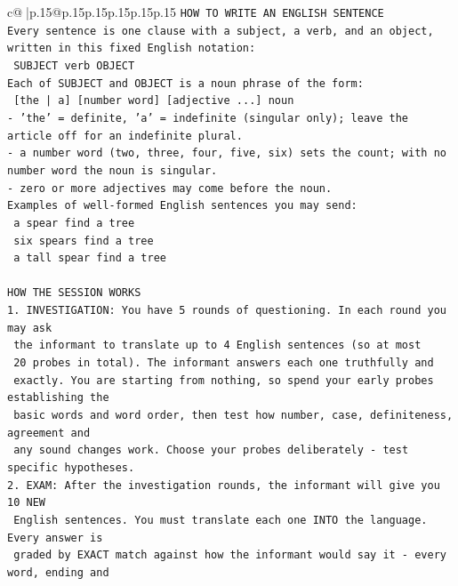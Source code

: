 \documentclass{article}
\begin{document}
{\begin{supertabular}{c@{$\;$}|p{.15\linewidth}@{}p{.15\linewidth}p{.15\linewidth}p{.15\linewidth}p{.15\linewidth}p{.15\linewidth}}
{{{\texttt{HOW TO WRITE AN ENGLISH SENTENCE} \\
\texttt{Every sentence is one clause with a subject, a verb, and an object, written in this fixed English notation:} \\
\texttt{    SUBJECT  verb  OBJECT} \\
\texttt{Each of SUBJECT and OBJECT is a noun phrase of the form:} \\
\texttt{    {[}the | a{]}  {[}number word{]}  {[}adjective ...{]}  noun} \\
\texttt{{-} 'the' = definite, 'a' = indefinite (singular only); leave the article off for an indefinite plural.} \\
\texttt{{-} a number word (two, three, four, five, six) sets the count; with no number word the noun is singular.} \\
\texttt{{-} zero or more adjectives may come before the noun.} \\
\texttt{Examples of well{-}formed English sentences you may send:} \\
\texttt{    a spear find a tree} \\
\texttt{    six spears find a tree} \\
\texttt{    a tall spear find a tree} \\
\\ 
\texttt{HOW THE SESSION WORKS} \\
\texttt{1. INVESTIGATION: You have 5 rounds of questioning. In each round you may ask} \\
\texttt{   the informant to translate up to 4 English sentences (so at most} \\
\texttt{   20 probes in total). The informant answers each one truthfully and} \\
\texttt{   exactly. You are starting from nothing, so spend your early probes establishing the} \\
\texttt{   basic words and word order, then test how number, case, definiteness, agreement and} \\
\texttt{   any sound changes work. Choose your probes deliberately {-} test specific hypotheses.} \\
\texttt{2. EXAM: After the investigation rounds, the informant will give you 10 NEW} \\
\texttt{   English sentences. You must translate each one INTO the language. Every answer is} \\
\texttt{   graded by EXACT match against how the informant would say it {-} every word, ending and} \\
}}}
\end{supertabular}}
\end{document}
